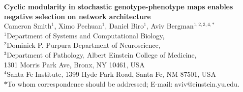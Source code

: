 



\let\ref\autoref


{}

\begin{center}
{\Large
\textbf{Cyclic modularity in stochastic genotype-phenotype maps enables negative selection on network architecture}
}
\\[.5cm]
Cameron Smith$^{1}$,
Ximo Pechuan$^{1}$,
Daniel Biro$^{1}$,
Aviv Bergman$^{1,2,3,4, \ast}$
\\[.5cm]
$^1$Department of Systems and Computational Biology,\\
$^2$Dominick P. Purpura Department of Neuroscience,\\
$^3$Department of Pathology, Albert Einstein College of Medicine,\\
1301 Morris Park Ave, Bronx, NY 10461, USA\\
$^4$Santa Fe Institute, 1399 Hyde Park Road, Santa Fe, NM 87501, USA
\\[.5cm]
$\ast$To whom correspondence should be addressed; E-mail: aviv@einstein.yu.edu.
\end{center}

% 

{ \bf

}
%



